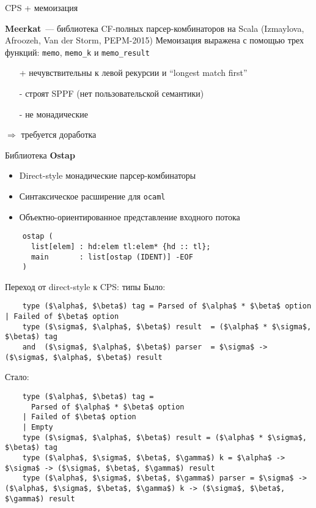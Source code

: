 \documentclass[10pt, mathserif]{beamer}
\theoremstyle{definition}
\begin{document}
\begin{frame}[fragile]{CPS + мемоизация}

  \textbf{Meerkat}~--- библиотека CF-полных парсер-комбинаторов на Scala (Izmaylova, Afroozeh, Van der Storm, PEPM-2015)
  \vskip3mm
  Мемоизация выражена с помощью трех функций: \lstinline|memo|, \lstinline|memo_k| и \lstinline|memo_result|

  \begin{itemize}
    \item[+] нечувствительны к левой рекурсии и ``longest match first''
    \item[-] строят SPPF (нет пользовательской семантики)
    \item[-] не монадические
  \end{itemize}
  \vskip3mm

  $\Rightarrow$ требуется доработка

\end{frame}

\begin{frame}[fragile]{Библиотека \textbf{Ostap}}
  \begin{itemize}
    \item Direct-style монадические парсер-комбинаторы
    \item Синтаксическое расширение для \texttt{ocaml}
    \item Объектно-ориентированное представление входного потока
  \end{itemize}
  \vskip3mm
  \begin{lstlisting}
    ostap (
      list[elem] : hd:elem tl:elem* {hd :: tl};
      main       : list[ostap (IDENT)] -EOF
    )
  \end{lstlisting}

\end{frame}

\begin{frame}[fragile]{Переход от direct-style к CPS: типы}
  Было:
  \begin{lstlisting}
    type ($\alpha$, $\beta$) tag = Parsed of $\alpha$ * $\beta$ option | Failed of $\beta$ option
    type ($\sigma$, $\alpha$, $\beta$) result  = ($\alpha$ * $\sigma$, $\beta$) tag
    and  ($\sigma$, $\alpha$, $\beta$) parser  = $\sigma$ -> ($\sigma$, $\alpha$, $\beta$) result
  \end{lstlisting}

  Стало:
  \begin{lstlisting}
    type ($\alpha$, $\beta$) tag =
      Parsed of $\alpha$ * $\beta$ option
    | Failed of $\beta$ option
    | Empty
    type ($\sigma$, $\alpha$, $\beta$) result = ($\alpha$ * $\sigma$, $\beta$) tag
    type ($\alpha$, $\sigma$, $\beta$, $\gamma$) k = $\alpha$ -> $\sigma$ -> ($\sigma$, $\beta$, $\gamma$) result
    type ($\alpha$, $\sigma$, $\beta$, $\gamma$) parser = $\sigma$ -> ($\alpha$, $\sigma$, $\beta$, $\gamma$) k -> ($\sigma$, $\beta$, $\gamma$) result
  \end{lstlisting}

\end{frame}
\end{document}
